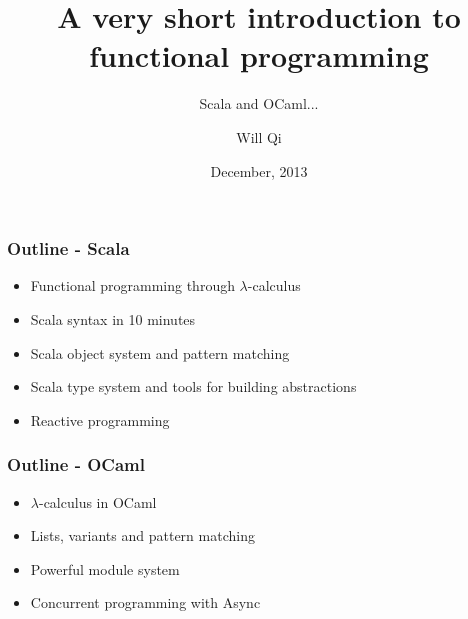 \documentclass[handout]{beamer}
\title{A very short introduction to functional programming}
\subtitle{Scala and OCaml...}
\author{Will Qi}
\date{December, 2013}
\begin{document}
\maketitle

\begin{frame}
  \frametitle{Outline - Scala}
  \begin{itemize}
  \item Functional programming through $\lambda$-calculus
    \pause
  \item Scala syntax in 10 minutes
    \pause
  \item Scala object system and pattern matching
    \pause
  \item Scala type system and tools for building abstractions
    \pause
    \item Reactive programming
  \end{itemize}
\end{frame}

\begin{frame}
  \frametitle{Outline - OCaml}
  \begin{itemize}
    \item $\lambda$-calculus in OCaml
      \pause
    \item Lists, variants and pattern matching
      \pause
    \item Powerful module system
      \pause
    \item Concurrent programming with Async
  \end{itemize}
\end{frame}
\end{document}
